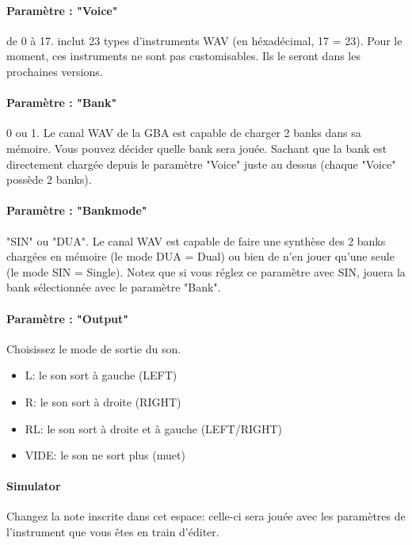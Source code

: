 \documentclass[12pt,a4paper]{article}
\begin{document}
        \paragraph{Paramètre : "Voice"} de 0 à 17. \FAT inclut 23 types d'instruments WAV (en héxadécimal, 17 = 23). Pour le moment, ces instruments ne sont pas customisables. Ils le seront dans les prochaines versions.

        \paragraph{Paramètre : "Bank"} 0 ou 1. Le canal WAV de la GBA est capable de charger 2 banks dans sa mémoire. Vous pouvez décider quelle bank sera jouée. Sachant que la bank est directement chargée depuis le paramètre "Voice" juste au dessus (chaque "Voice" possède 2 banks).

        \paragraph{Paramètre : "Bankmode"} "SIN" ou "DUA". Le canal WAV est capable de faire une synthèse des 2 banks chargées en mémoire (le mode DUA = Dual) ou bien de n'en jouer qu'une seule (le mode SIN = Single). Notez que si vous réglez ce paramètre avec SIN, \FAT jouera la bank sélectionnée avec le paramètre "Bank".

        \paragraph{Paramètre : "Output"} Choisissez le mode de sortie du son.
            \begin{itemize}
                \item{L: le son sort à gauche (LEFT)}
                \item{R: le son sort à droite (RIGHT)}
                \item{RL: le son sort à droite et à gauche (LEFT/RIGHT)}
                \item{VIDE: le son ne sort plus (muet)}
            \end{itemize}

        \paragraph{Simulator} Changez la note inscrite dans cet espace: celle-ci sera jouée avec les paramètres de l'instrument que vous êtes en train d'éditer.
\end{document}
